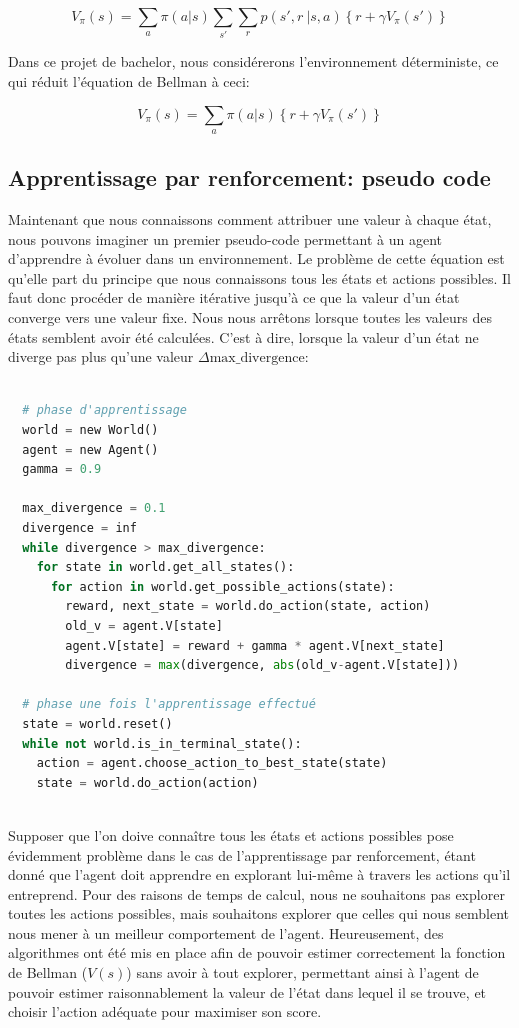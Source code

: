 \documentclass[11pt,a4paper]{report}
\begin{document}
    $$V_\pi(s) = \sum_a\pi(a|s)\sum_{s'}\sum_rp(s',r\ |s,a)\left\{r+\gamma V_\pi(s')\right\}$$
    
    \par Dans ce projet de bachelor, nous considérerons l'environnement déterministe, ce qui réduit l'équation de Bellman à ceci: 
    
    $$V_\pi(s) = \sum_a\pi(a|s)\left\{r+\gamma V_\pi(s')\right\}$$

    
  \subsection{Apprentissage par renforcement: pseudo code}
  
  \par Maintenant que nous connaissons comment attribuer une valeur à chaque état, nous pouvons imaginer un premier pseudo-code permettant à un agent d'apprendre à évoluer dans un environnement. Le problème de cette équation est qu'elle part du principe que nous connaissons tous les états et actions possibles. Il faut donc procéder de manière itérative jusqu'à ce que la valeur d'un état converge vers une valeur fixe. Nous nous arrêtons lorsque toutes les valeurs des états semblent avoir été calculées. C'est à dire, lorsque la valeur d'un état ne diverge pas plus qu'une valeur $\Delta\text{max\_divergence}$:  
  
   \begin{lstlisting}[language=python]
 
  # phase d'apprentissage
  world = new World()
  agent = new Agent()
  gamma = 0.9
  
  max_divergence = 0.1
  divergence = inf
  while divergence > max_divergence:
    for state in world.get_all_states():
      for action in world.get_possible_actions(state):
        reward, next_state = world.do_action(state, action)
        old_v = agent.V[state]
        agent.V[state] = reward + gamma * agent.V[next_state]
        divergence = max(divergence, abs(old_v-agent.V[state]))
        
  # phase une fois l'apprentissage effectué
  state = world.reset()
  while not world.is_in_terminal_state():
    action = agent.choose_action_to_best_state(state)
    state = world.do_action(action)
        
   \end{lstlisting}
  
  \par Supposer que l'on doive connaître tous les états et actions possibles pose évidemment problème dans le cas de l'apprentissage par renforcement, étant donné que l'agent doit apprendre en explorant lui-même à travers les actions qu'il entreprend. Pour des raisons de temps de calcul, nous ne souhaitons pas explorer toutes les actions possibles, mais souhaitons explorer que celles qui nous semblent nous mener à un meilleur comportement de l'agent. Heureusement, des algorithmes ont été mis en place afin de pouvoir estimer correctement la fonction de Bellman ($V(s)$) sans avoir à tout explorer, permettant ainsi à l'agent de pouvoir estimer raisonnablement la valeur de l'état dans lequel il se trouve, et choisir l'action adéquate pour maximiser son score. 
    
\end{document}

